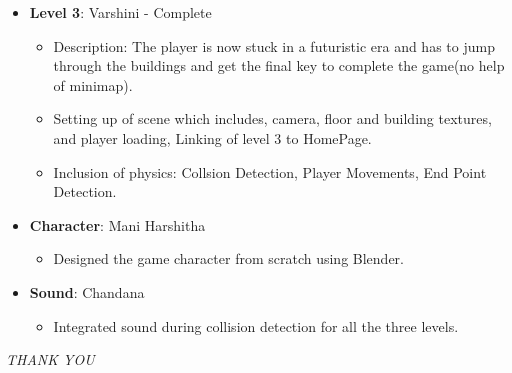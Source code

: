 \documentclass[9pt]{beamer}
\begin{document}
\begin{frame}
    \begin{itemize}
        \item \textbf{Level 3}: Varshini - Complete
            \begin{itemize}
                \item Description: The player is now stuck in a futuristic era and has to jump through the buildings and get the final key to complete the game(no help of minimap).
                \item Setting up of scene which includes, camera, floor and building textures, and player loading, Linking of level 3 to HomePage.
                \item Inclusion of physics: Collsion Detection, Player Movements, End Point Detection.
            \end{itemize}
            \vspace{0.5em}
        \item \textbf{Character}: Mani Harshitha
            \begin{itemize}
                \item Designed the game character from scratch using Blender.
            \end{itemize}
            \vspace{0.5em}
        \item \textbf{Sound}: Chandana
            \begin{itemize}
                \item Integrated sound during collision detection for all the three levels.
            \end{itemize}
    \end{itemize}
\end{frame}
    

\begin{frame}
\centering
\Huge
\emph{THANK YOU}
\end{frame}
\end{document}
